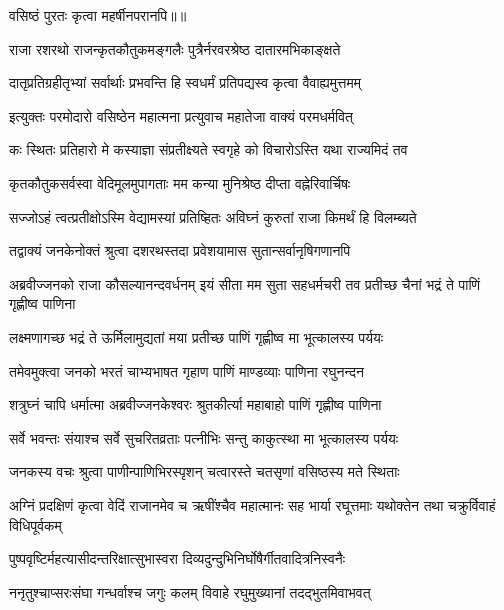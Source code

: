{वसिष्ठं पुरतः कृत्वा महर्षीनपरानपि॥॥} %

\addtocounter{shlokacount}{1}

\twolineshloka
{राजा रशरथो राजन्कृतकौतुकमङ्गलैः}
{पुत्रैर्नरवरश्रेष्ठ दातारमभिकाङ्क्षते} %

\twolineshloka
{दातृप्रतिग्रहीतृभ्यां सर्वार्थाः प्रभवन्ति हि}
{स्वधर्मं प्रतिपद्यस्व कृत्वा वैवाह्यमुत्तमम्} %

\twolineshloka
{इत्युक्तः परमोदारो वसिष्ठेन महात्मना}
{प्रत्युवाच महातेजा वाक्यं परमधर्मवित्} %

\twolineshloka
{कः स्थितः प्रतिहारो मे कस्याज्ञा संप्रतीक्ष्यते}
{स्वगृहे को विचारोऽस्ति यथा राज्यमिदं तव} %

\twolineshloka
{कृतकौतुकसर्वस्वा वेदिमूलमुपागताः}
{मम कन्या मुनिश्रेष्ठ दीप्ता वह्नेरिवार्चिषः} %

\twolineshloka
{सज्जोऽहं त्वत्प्रतीक्षोऽस्मि वेद्यामस्यां प्रतिष्हितः}
{अविघ्नं कुरुतां राजा किमर्थं हि विलम्ब्यते} %

\twolineshloka
{तद्वाक्यं जनकेनोक्तं श्रुत्वा दशरथस्तदा}
{प्रवेशयामास सुतान्सर्वानृषिगणानपि} %

\threelineshloka
{अब्रवीज्जनको राजा कौसल्यानन्दवर्धनम्}
{इयं सीता मम सुता सहधर्मचरी तव}
{प्रतीच्छ चैनां भद्रं ते पाणिं गृह्णीष्व पाणिना} %

\twolineshloka
{लक्ष्मणागच्छ भद्रं ते ऊर्मिलामुद्यतां मया}
{प्रतीच्छ पाणिं गृह्णीष्व मा भूत्कालस्य पर्ययः} %

\twolineshloka
{तमेवमुक्त्वा जनको भरतं चाभ्यभाषत}
{गृहाण पाणिं माण्डव्याः पाणिना रघुनन्दन} %

\twolineshloka
{शत्रुघ्नं चापि धर्मात्मा अब्रवीज्जनकेश्वरः}
{श्रुतकीर्त्या महाबाहो पाणिं गृह्णीष्व पाणिना} %

\twolineshloka
{सर्वे भवन्तः संयाश्च सर्वे सुचरितव्रताः}
{पत्नीभिः सन्तु काकुत्स्था मा भूत्कालस्य पर्ययः} %

\twolineshloka
{जनकस्य वचः श्रुत्वा पाणीन्पाणिभिरस्पृशन्}
{चत्वारस्ते चतसृणां वसिष्ठस्य मते स्थिताः} %

\threelineshloka
{अग्निं प्रदक्षिणं कृत्वा वेदिं राजानमेव च}
{ऋषींश्चैव महात्मानः सह भार्या रघूत्तमाः}
{यथोक्तेन तथा चक्रुर्विवाहं विधिपूर्वकम्} %

\twolineshloka
{पुष्पवृष्टिर्महत्यासीदन्तरिक्षात्सुभास्वरा}
{दिव्यदुन्दुभिनिर्घोषैर्गीतवादित्रनिस्वनैः} %

\twolineshloka
{ननृतुश्चाप्सरःसंघा गन्धर्वाश्च जगुः कलम्}
{विवाहे रघुमुख्यानां तदद्भुतमिवाभवत्} %

